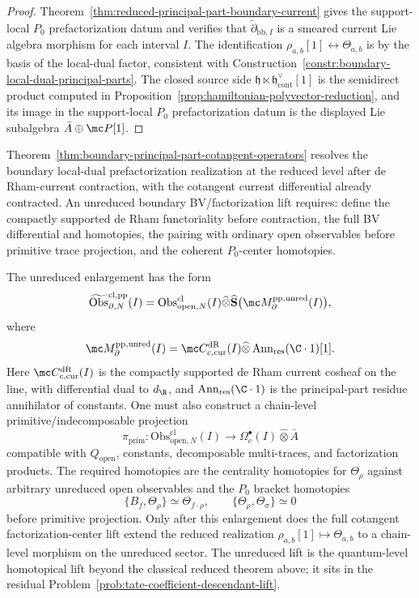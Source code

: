 \documentclass[11pt]{memoir}
\begin{document}
\begin{proof}
  Theorem~\ref{thm:reduced-principal-part-boundary-current} gives the
  support-local \(P_0\) prefactorization datum and verifies that
  $\widetilde\partial_{\mathrm{bb},I}$ is a smeared current Lie algebra
  morphism for each interval \(I\). The
  identification $\rho_{a,b}[1]\leftrightarrow\Theta_{a,b}$ is by the
  basis of the local-dual factor, consistent with
  Construction~\ref{constr:boundary-local-dual-principal-parts}. The
  closed source side
  $\mathfrak h\ltimes\mathfrak h^{\vee}_{\mathrm{cont}}[1]$ is the
  semidirect product computed in
  Proposition~\ref{prop:hamiltonian-polyvector-reduction}, and its image
  in the support-local \(P_0\) prefactorization datum is the displayed Lie subalgebra
  $\bar A\oplus\mc P[1]$.
\end{proof}

\begin{rmk}\label{rmk:unreduced-lift-obstruction}
  Theorem~\ref{thm:boundary-principal-part-cotangent-operators} resolves
  the boundary local-dual prefactorization realization at the reduced
  level after de Rham-current contraction, with the cotangent current
  differential already contracted.  An unreduced boundary BV/factorization
  lift requires:
  define the compactly supported de Rham functoriality before
  contraction, the full BV differential and homotopies, the pairing with
  ordinary open observables before primitive trace projection, and the
  coherent $P_0$-center homotopies.

  The unreduced enlargement has the form
  $$\widetilde{\mathrm{Obs}}^{\mathrm{cl,pp}}_{\partial,N}(I)
    =
    \mathrm{Obs}^{\mathrm{cl}}_{\mathrm{open},N}(I)
    \widehat\otimes
    \widehat{\mathbf S}\bigl(\mc M^{\mathrm{pp,unred}}_\partial(I)\bigr),$$
  where
  $$\mc M^{\mathrm{pp,unred}}_\partial(I)
    =
    \mc C^{\mathrm{dR}}_{c,\mathrm{cur}}(I)
    \widehat\otimes
    \operatorname{Ann}_{\mathrm{res}}(\C\cdot1)[1].$$
  Here $\mc C^{\mathrm{dR}}_{c,\mathrm{cur}}(I)$ is the compactly
  supported de Rham current cosheaf on the line, with differential dual
  to $d_\R$, and $\operatorname{Ann}_{\mathrm{res}}(\C\cdot1)$ is the
  principal-part residue annihilator of constants. One must also construct a chain-level
  primitive/indecomposable projection
  $$\pi_{\mathrm{prim}}:
    \mathrm{Obs}^{\mathrm{cl}}_{\mathrm{open},N}(I)
    \longrightarrow
    \Omega_c^\bullet(I)\widehat\otimes\bar A$$
  compatible with $Q_{\mathrm{open}}$, constants, decomposable
  multi-traces, and factorization products. The required homotopies
  are the centrality homotopies for $\Theta_\rho$ against arbitrary
  unreduced open observables and the $P_0$ bracket homotopies
  $$\{B_f,\Theta_\rho\}\simeq\Theta_{f\cdot\rho},\qquad
    \{\Theta_\rho,\Theta_\sigma\}\simeq0$$
  before primitive projection. Only after this enlargement does the
  full cotangent factorization-center lift extend the reduced
  realization $\rho_{a,b}[1]\mapsto\Theta_{a,b}$ to a chain-level
  morphism on the unreduced sector. The unreduced lift is the
  quantum-level homotopical lift beyond the classical reduced theorem
  above; it sits in the residual
  Problem~\ref{prob:tate-coefficient-descendant-lift}.
\end{rmk}
\end{document}
